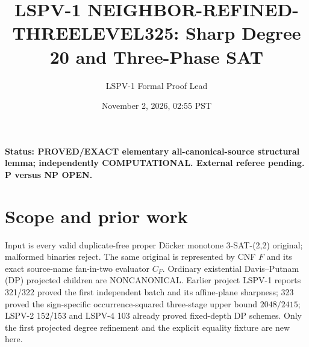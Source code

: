 \documentclass[11pt]{article}
\title{LSPV-1 NEIGHBOR-REFINED-THREELEVEL325: Sharp Degree 20 and Three-Phase SAT}
\author{LSPV-1 Formal Proof Lead}
\date{November 2, 2026, 02:55 PST}
\begin{document}
\maketitle
\noindent\textbf{Status: PROVED/EXACT elementary all-canonical-source structural lemma; independently COMPUTATIONAL. External referee pending. P versus NP OPEN.}
\section{Scope and prior work}
Input is every valid duplicate-free proper D\"ocker monotone 3-SAT-(2,2) original; malformed binaries reject. The same original is represented by CNF $F$ and its exact source-name fan-in-two evaluator $C_F$. Ordinary existential Davis--Putnam (DP) projected children are NONCANONICAL. Earlier project LSPV-1 reports 321/322 proved the first independent batch and its affine-plane sharpness; 323 proved the sign-specific occurrence-squared three-stage upper bound $2048/2415$; LSPV-2 152/153 and LSPV-4 103 already proved fixed-depth DP schemes. Only the first projected degree refinement and the explicit equality fixture are new here.
\end{document}
